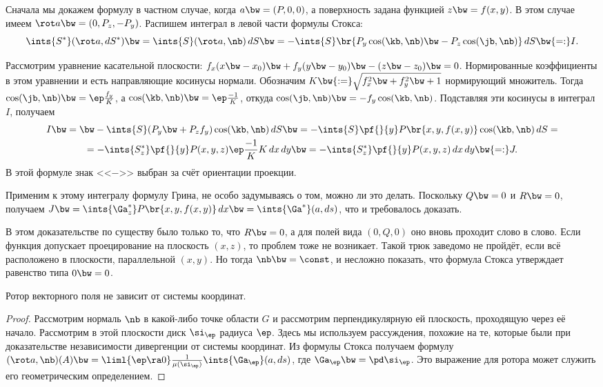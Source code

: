 \documentclass[a4paper]{article}
\begin{document}
Сначала мы докажем формулу в частном случае, когда $a \bw= (P,0,0)$, а поверхность задана
функцией $z \bw= f(x,y)$. В этом случае имеем $\rot a \bw= (0,P_z,-P_y)$. Распишем интеграл
в левой части формулы Стокса:
$$
  \ints{S^*}(\rot a, d S^*) \bw= \ints{S}(\rot a,\nb)\,d S \bw=
  -\ints{S} \br{P_y\cos(\kb, \nb) \bw- P_z\cos(\jb, \nb)}\,d S \bw{=:} I.
$$

Рассмотрим уравнение касательной плоскости: $f_x(x\bw-x_0) \bw+ f_y(y\bw-y_0) \bw- (z\bw-z_0) \bw= 0$.
Нормированные коэффициенты в этом уравнении и есть направляющие косинусы нормали. Обозначим $K \bw{:=}
\sqrt{f_x^2 \bw+ f_y^2 \bw+ 1}$ нормирующий множитель. Тогда $\cos(\jb, \nb) \bw= \ep\frac{f_y}{K}$, а
$\cos (\kb, \nb) \bw= \ep\frac{-1}{K}$, откуда $\cos(\jb, \nb) \bw= -f_y\cos (\kb, \nb)$. Подставляя эти
косинусы в интеграл $I$, получаем
\begin{multline*}
I \bw= \bw-\ints{S}(P_y \bw+ P_zf_y)\cos (\kb, \nb)\,d S \bw=
-\ints{S}\pf{}{y}P\br{x,y,f(x,y)} \cos(\kb, \nb)\,d S =\\=
-\ints{S_z^*} \pf{}{y} P(x,y,z) \ep\frac{-1}{K} K\,d x \,d y \bw=
-\ints{S_z^*} \pf{}{y} P(x,y,z)\,d x \,d y \bw{=:} J.
\end{multline*}
В этой формуле знак <<$-$>> выбран за счёт ориентации проекции.

Применим к этому интегралу формулу Грина, не особо задумываясь о том, можно ли это делать. Поскольку
$Q \bw= 0$ и $R \bw= 0$, получаем $J \bw= \ints{\Ga_z^*}P\br{x,y,f(x,y)}\,d x \bw= \ints{\Ga^*}(a, d s)$,
что и требовалось доказать.

В этом доказательстве по существу было только то, что $R \bw= 0$, а для полей вида $(0,Q, 0)$ оно вновь
проходит слово в слово. Если функция допускает проецирование на плоскость $(x,z)$, то проблем тоже не
возникает. Такой трюк заведомо не пройдёт, если всё расположено в плоскости, параллельной $(x, y)$. Но тогда
$\nb \bw= \const$, и несложно показать, что формула Стокса утверждает равенство типа $0\bw=0$.

\begin{imp}
Ротор векторного поля не зависит от системы координат.
\end{imp}
\begin{proof}
Рассмотрим нормаль $\nb$ в какой-либо точке области $G$ и рассмотрим перпендикулярную ей плоскость,
проходящую через её начало. Рассмотрим в этой плоскости диск $\si_\ep$ радиуса $\ep$. Здесь мы используем
рассуждения, похожие на те, которые были при доказательстве независимости дивергенции от системы координат.
Из формулы Стокса получаем формулу $(\rot a, \nb)(A) \bw= \liml{\ep \ra 0}
\frac{1}{\mu(\si_\ep)}\ints{\Ga_\ep}(a, d s)$, где $\Ga_\ep \bw= \pd \si_\ep$. Это выражение для ротора
может служить его геометрическим определением.
\end{proof}
\end{document}
